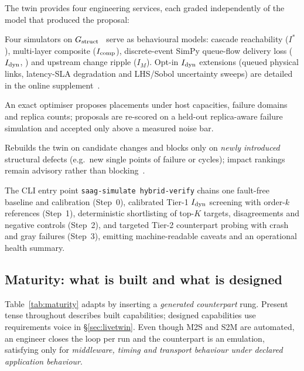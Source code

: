 The twin provides four engineering services, each graded independently of the model that produced the proposal:
\begin{description}[leftmargin=1em,style=nextline,nosep]
  \item[What-if failure analysis.] Four simulators on $G_{\mathrm{struct}}$~\citep{yigit2026jss} serve as behavioural models: cascade reachability ($I^*$), multi-layer composite ($I_{\mathrm{comp}}$), discrete-event SimPy queue-flow delivery loss ($I_{\mathrm{dyn}}$, \citealp{team2020simpy}) and upstream change ripple ($I_M$). Opt-in $I_{\mathrm{dyn}}$ extensions (queued physical links, latency-SLA degradation and LHS/Sobol uncertainty sweeps) are detailed in the online supplement~\citep{sag-software}.
  \item[Placement verification.] An exact optimiser proposes placements under host capacities, failure domains and replica counts; proposals are re-scored on a held-out replica-aware failure simulation and accepted only above a measured noise bar.
  \item[Change gating.] Rebuilds the twin on candidate changes and blocks only on \emph{newly introduced} structural defects (e.g.\ new single points of failure or cycles); impact rankings remain advisory rather than blocking~\citep{yigit2026jss}.
  \item[Hybrid two-tiered verification.] The CLI entry point \texttt{saag-simulate hybrid-verify} chains one fault-free baseline and calibration (Step~0), calibrated Tier-1 $I_{\mathrm{dyn}}$ screening with order-$k$ references (Step~1), deterministic shortlisting of top-$K$ targets, disagreements and negative controls (Step~2), and targeted Tier-2 counterpart probing with crash and gray failures (Step~3), emitting machine-readable caveats and an operational health summary.
\end{description}

\subsection{Maturity: what is built and what is designed}
\label{sec:maturity}

Table~\ref{tab:maturity} adapts \citet{kritzinger2018digital} by inserting a \emph{generated counterpart} rung. Present tense throughout describes built capabilities; designed capabilities use requirements voice in \S\ref{sec:livetwin}. Even though M2S and S2M are automated, an engineer closes the loop per run and the counterpart is an emulation, satisfying \citet{wright2020tell} only for \emph{middleware, timing and transport behaviour under declared application behaviour}.

